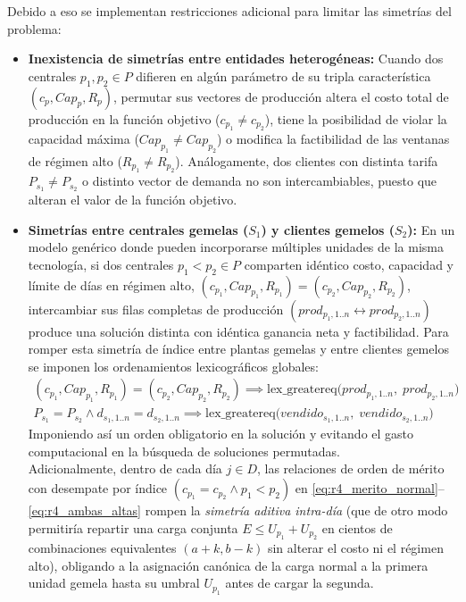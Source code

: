 Debido a eso se implementan restricciones adicional para limitar las simetrías del problema:

\begin{itemize}
    \item \textbf{Inexistencia de simetrías entre entidades heterogéneas:} Cuando dos centrales $p_1, p_2 \in P$ difieren en algún parámetro de su tripla característica $(c_p, Cap_p, R_p)$, permutar sus vectores de producción altera el costo total de producción en la función objetivo ($c_{p_1} \neq c_{p_2}$), tiene la posibilidad de violar la capacidad máxima ($Cap_{p_1} \neq Cap_{p_2}$) o modifica la factibilidad de las ventanas de régimen alto ($R_{p_1} \neq R_{p_2}$). Análogamente, dos clientes con distinta tarifa $P_{s_1} \neq P_{s_2}$ o distinto vector de demanda no son intercambiables, puesto que alteran el valor de la función objetivo. 

    \item \textbf{Simetrías entre centrales gemelas ($S_1$) y clientes gemelos ($S_2$):} En un modelo genérico donde pueden incorporarse múltiples unidades de la misma tecnología, si dos centrales $p_1 < p_2 \in P$ comparten idéntico costo, capacidad y límite de días en régimen alto, $(c_{p_1}, Cap_{p_1}, R_{p_1}) = (c_{p_2}, Cap_{p_2}, R_{p_2})$, intercambiar sus filas completas de producción $(prod_{p_1, 1..n} \leftrightarrow prod_{p_2, 1..n})$ produce una solución distinta con idéntica ganancia neta y factibilidad. Para romper esta simetría de índice entre plantas gemelas y entre clientes gemelos se imponen los ordenamientos lexicográficos globales:
    \begin{align}
        (c_{p_1}, Cap_{p_1}, R_{p_1}) = (c_{p_2}, Cap_{p_2}, R_{p_2}) \implies \text{lex\_greatereq}\big(prod_{p_1, 1..n},\; prod_{p_2, 1..n}\big) \label{eq:s1_lex_plantas} \\
        P_{s_1} = P_{s_2} \land d_{s_1, 1..n} = d_{s_2, 1..n} \implies \text{lex\_greatereq}\big(vendido_{s_1, 1..n},\; vendido_{s_2, 1..n}\big) \label{eq:s2_lex_clientes}
    \end{align}
    Imponiendo así un orden obligatorio en la solución y evitando el gasto computacional en la búsqueda de soluciones permutadas.\\
    
    Adicionalmente, dentro de cada día $j \in D$, las relaciones de orden de mérito con desempate por índice $(c_{p_1} = c_{p_2} \land p_1 < p_2)$ en \eqref{eq:r4_merito_normal}--\eqref{eq:r4_ambas_altas} rompen la \emph{simetría aditiva intra-día} (que de otro modo permitiría repartir una carga conjunta $E \le U_{p_1} + U_{p_2}$ en cientos de combinaciones equivalentes $(a+k, b-k)$ sin alterar el costo ni el régimen alto), obligando a la asignación canónica de la carga normal a la primera unidad gemela hasta su umbral $U_{p_1}$ antes de cargar la segunda.
    
\end{itemize}
